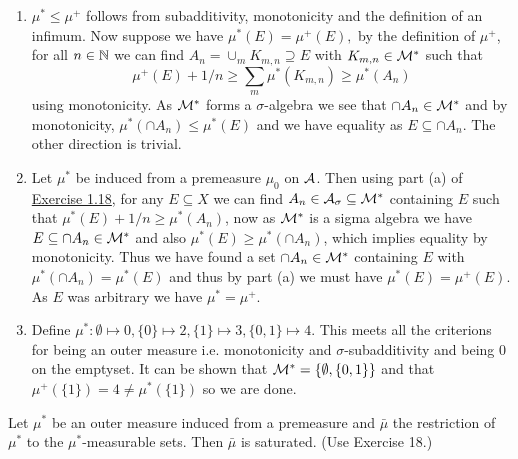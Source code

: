 \documentclass[12pt,a4paper]{article}
\begin{document}
\begin{solution}
    \begin{enumerate}[label=\alph*.]
        \item $\mu^*\leq\mu^+$ follows from subadditivity, monotonicity and the definition of an infimum. 
        Now suppose we have $\mu^*(E)=\mu^+(E),$ by the definition of $\mu^+$, for all $n\in\mathbb{N}$ we can find $A_n=\cup_m K_{m,n}\supseteq E$ with $K_{m,n}\in\mathcal{M}^*$ such that 
        $$\mu^+(E)+1/n\geq\sum_m\mu^*(K_{m,n})\geq\mu^*(A_n)$$
        using monotonicity. As $\mathcal{M}^*$ forms a $\sigma$-algebra we see that $\cap A_n\in\mathcal{M}^*$ and by monotonicity, $\mu^*(\cap A_n)\leq\mu^*(E)$ and we have equality as $E\subseteq\cap A_n$. 
        The other direction is trivial.
        \item Let $\mu^*$ be induced from a premeasure $\mu_0$ on $\mathcal{A}$. Then using part (a) of \hyperref[prob:1-18]{Exercise 1.18}, for any $E\subseteq X$ we can find $A_n\in\mathcal{A}_\sigma\subseteq\mathcal{M}^*$ containing $E$ such that $\mu^*(E)+1/n\geq\mu^*(A_n)$, now as $\mathcal{M}^*$ is a sigma algebra we have $E\subseteq\cap A_n\in\mathcal{M}^*$ and also $\mu^*(E)\geq\mu^*(\cap A_n)$, which implies equality by monotonicity. 
        Thus we have found a set $\cap A_n\in\mathcal{M}^*$ containing $E$ with $\mu^*(\cap A_n)=\mu^*(E)$ and thus by part (a) we must have $\mu^*(E)=\mu^+(E).$
        As $E$ was arbitrary we have $\mu^*=\mu^+.$
        \item Define $\mu^*:\emptyset\mapsto 0,\{0\}\mapsto 2,\{1\}\mapsto 3,\{0,1\}\mapsto 4$. 
        This meets all the criterions for being an outer measure i.e. monotonicity and $\sigma$-subadditivity and being $0$ on the emptyset.
        It can be shown that $\mathcal{M}^*=\{\emptyset,\{0,1\}\}$ and that $\mu^+(\{1\})=4\neq\mu^*(\{1\})$ so we are done.
     \end{enumerate}
\end{solution}
\begin{problem}\label{prob:1-21}
Let $\mu^*$ be an outer measure induced from a premeasure and $\bar{\mu}$ the restriction of $\mu^*$ to the $\mu^*$-measurable sets. Then $\bar{\mu}$ is saturated. (Use Exercise 18.)
\end{problem}
\end{document}
